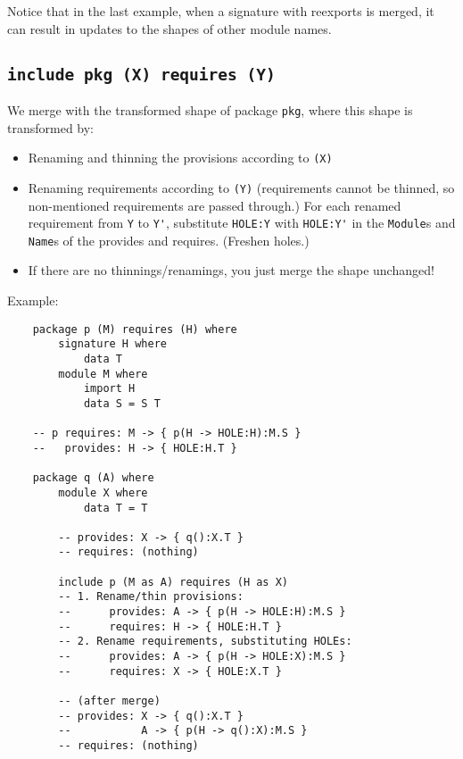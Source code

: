 \documentclass{article}
\begin{document}
Notice that in the last example, when a signature with reexports is merged,
it can result in updates to the shapes of other module names.

\newpage

\subsection{\texttt{include pkg (X) requires (Y)}}

We merge with the transformed shape of package \verb|pkg|, where this
shape is transformed by:

\begin{itemize}
    \item Renaming and thinning the provisions according to \verb|(X)|
    \item Renaming requirements according to \verb|(Y)| (requirements cannot
          be thinned, so non-mentioned requirements are passed through.)
          For each renamed requirement from \verb|Y| to \verb|Y'|,
          substitute \verb|HOLE:Y| with \verb|HOLE:Y'| in the
          \verb|Module|s and \verb|Name|s of the provides and requires.
          (Freshen holes.)
    \item If there are no thinnings/renamings, you just merge the
          shape unchanged!
\end{itemize}

\noindent Example:

\begin{verbatim}
    package p (M) requires (H) where
        signature H where
            data T
        module M where
            import H
            data S = S T

    -- p requires: M -> { p(H -> HOLE:H):M.S }
    --   provides: H -> { HOLE:H.T }

    package q (A) where
        module X where
            data T = T

        -- provides: X -> { q():X.T }
        -- requires: (nothing)

        include p (M as A) requires (H as X)
        -- 1. Rename/thin provisions:
        --      provides: A -> { p(H -> HOLE:H):M.S }
        --      requires: H -> { HOLE:H.T }
        -- 2. Rename requirements, substituting HOLEs:
        --      provides: A -> { p(H -> HOLE:X):M.S }
        --      requires: X -> { HOLE:X.T }

        -- (after merge)
        -- provides: X -> { q():X.T }
        --           A -> { p(H -> q():X):M.S }
        -- requires: (nothing)
\end{verbatim}
\end{document}
